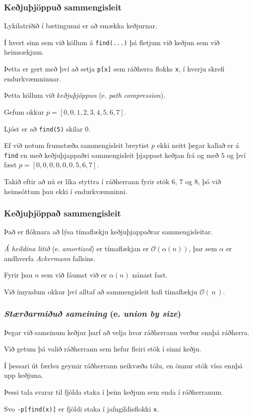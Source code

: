 {
	\frametitle{Keðjuþjöppuð sammengisleit}
	{
		\item<1-> Lykilatriðið í bætingunni er að smækka keðjurnar.
		\item<2-> Í hvert sinn sem við köllum á \texttt{find(...)} þá fletjum við keðjun sem við heimsækjum.
		\item<3-> Þetta er gert með því að setja \texttt{p[x]} sem ráðherra flokks \texttt{x}, í hverju skrefi endurkvæmninnar.
		\item<4-> Þetta köllum við \emph{keðjuþjöppun} (e. \emph{path compression}).
	}
}

{
	{
		\item<1-> Gefum okkur
			$p = [0, 0, 1, 2, 3, 4, 5, 6, 7]$.
		\item<2-> Ljóst er að \texttt{find(5)} skilar $0$.
		\item<3-> Ef við notum frumstæða sammengisleit breytist $p$ ekki neitt þegar kallað er á \texttt{find}
			en með keðjuþjappaðri sammengisleit þjappast keðjan frá og með $5$ og því fæst
			$p = [0, 0, 0, 0, 0, 0, 5, 6, 7]$.
		\item<4-> Takið eftir að nú er líka styttra í ráðherrann fyrir stök $6$, $7$ og $8$, þó við heimsóttum þau ekki í endurkvæmninni.
	}
}

{
	\frametitle{Keðjuþjöppað sammengisleit}
}

{
	{
		\item<1-> Það er flóknara að lýsa tímaflækju keðjuþjappaðrar sammengisleitar.
		\item<2-> \emph{Á heildina litið} (e. \emph{amortized}) er tímaflækjan er $\mathcal{O}(\alpha(n))$,
					þar sem $\alpha$ er andhverfa \emph{Ackermann} fallsins.
		\item<3-> Fyrir þau $n$ sem við fáumst við er $\alpha(n)$ nánast fast.
		\item<4-> Við ímyndum okkur því alltaf að sammengisleit hafi tímaflækju $\mathcal{O}(\,n\,)$.
	}
}

{
	\frametitle{\emph{Stærðarmiðuð sameining} (e. \emph{union by size})}
	{
		\item<1-> Þegar við sameinum keðjur þarf að velja hvor ráðherrann verður ennþá ráðherra.
		\item<2-> Við getum þá valið ráðherrann sem hefur fleiri stök í sinni keðju.
		\item<3->[] 
		\item<4-> Í þessari út færlsu geymir ráðherrann neikvæða tölu, en önnur stök vísa ennþá upp keðjuna.
		\item<5-> Þessi tala svarar til fjölda staka í þeim keðjum sem enda í ráðherranum.
		\item<6-> Svo \texttt{-p[find(x)]} er fjöldi staka í jafngildisflokki \texttt{x}.
	}
}

{
}



